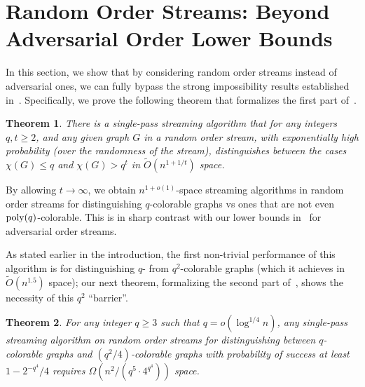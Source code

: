\documentclass[11pt]{article}
\newtheorem{theorem}{Theorem}
\theoremstyle{definition}
\renewcommand{\leq}{\leqslant}
\renewcommand{\geq}{\geqslant}
\newcommand{\Ot}{\ensuremath{\widetilde{O}}}
\newcommand{\poly}{\mbox{\rm poly}}
\begin{document}
	
	\clearpage
	

\section{Random Order Streams: Beyond Adversarial Order Lower Bounds}\label{sec:random}
	
In this section, we show that by considering random order streams instead of adversarial ones, we can fully bypass the strong impossibility results established in~. 
Specifically, we prove the following theorem that formalizes the first part of~. 

\begin{theorem}\label{thm:rand-upper}
	There is a single-pass streaming algorithm that for any integers $q,t \geq 2$, and any given graph $G$ in a random order stream, 
	with exponentially high probability (over the randomness of the stream), distinguishes between the cases $\chi(G) \leq q$ and $\chi(G) > q^t$ in $\Ot(n^{1+1/t})$ space. 
\end{theorem}

By allowing $t \rightarrow \infty$, we obtain $n^{1+o(1)}$-space streaming algorithms in random order streams for distinguishing $q$-colorable graphs vs ones that are not even $\poly(q)$-colorable. 
This is in sharp contrast with our lower bounds in~ for adversarial order streams. 


As stated earlier in the introduction, the first non-trivial performance of this algorithm is for distinguishing $q$- from $q^2$-colorable graphs (which it achieves in $\Ot(n^{1.5})$ space); our next theorem, formalizing the second part of~, 
shows the necessity of this $q^2$ ``barrier''. 

\begin{theorem}\label{thm:rand-lower}
	For any integer $q \geq 3$ such that  $q=o(\log^{1/4}{n})$, any single-pass streaming algorithm on random order streams for distinguishing between $q$-colorable graphs
	and $(q^2/4)$-colorable graphs with probability of success at least $1-2^{-q^4}/4$ requires $\Omega({n^2}/{(q^5 \cdot 4^{q^4})})$ space. 
\end{theorem}
\end{document}
